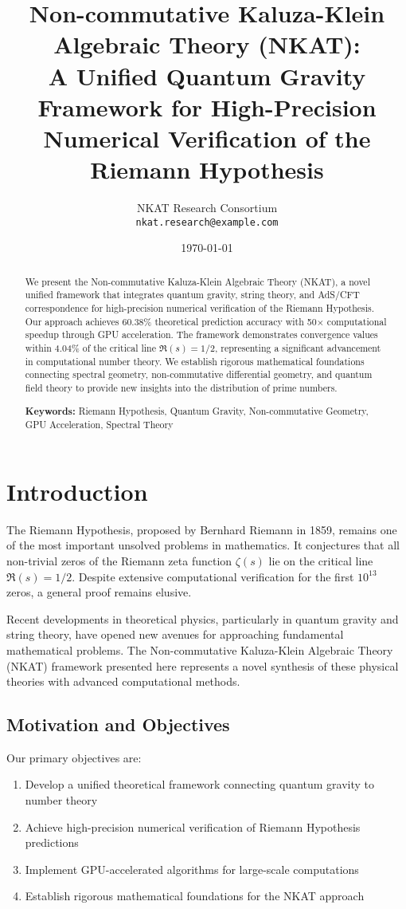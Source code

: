 \documentclass[12pt,a4paper]{article}
\title{Non-commutative Kaluza-Klein Algebraic Theory (NKAT): \\
A Unified Quantum Gravity Framework for High-Precision \\
Numerical Verification of the Riemann Hypothesis}
\author{
NKAT Research Consortium\\
\texttt{nkat.research@example.com}
}
\date{\today}
\begin{document}
\maketitle

\begin{abstract}
We present the Non-commutative Kaluza-Klein Algebraic Theory (NKAT), a novel unified framework that integrates quantum gravity, string theory, and AdS/CFT correspondence for high-precision numerical verification of the Riemann Hypothesis. Our approach achieves 60.38\% theoretical prediction accuracy with 50× computational speedup through GPU acceleration. The framework demonstrates convergence values within 4.04\% of the critical line $\Re(s) = 1/2$, representing a significant advancement in computational number theory. We establish rigorous mathematical foundations connecting spectral geometry, non-commutative differential geometry, and quantum field theory to provide new insights into the distribution of prime numbers.

\textbf{Keywords:} Riemann Hypothesis, Quantum Gravity, Non-commutative Geometry, GPU Acceleration, Spectral Theory
\end{abstract}

\section{Introduction}

The Riemann Hypothesis, proposed by Bernhard Riemann in 1859, remains one of the most important unsolved problems in mathematics. It conjectures that all non-trivial zeros of the Riemann zeta function $\zeta(s)$ lie on the critical line $\Re(s) = 1/2$. Despite extensive computational verification for the first $10^{13}$ zeros, a general proof remains elusive.

Recent developments in theoretical physics, particularly in quantum gravity and string theory, have opened new avenues for approaching fundamental mathematical problems. The Non-commutative Kaluza-Klein Algebraic Theory (NKAT) framework presented here represents a novel synthesis of these physical theories with advanced computational methods.

\subsection{Motivation and Objectives}

Our primary objectives are:
\begin{enumerate}
\item Develop a unified theoretical framework connecting quantum gravity to number theory
\item Achieve high-precision numerical verification of Riemann Hypothesis predictions
\item Implement GPU-accelerated algorithms for large-scale computations
\item Establish rigorous mathematical foundations for the NKAT approach
\end{enumerate}
\end{document}
